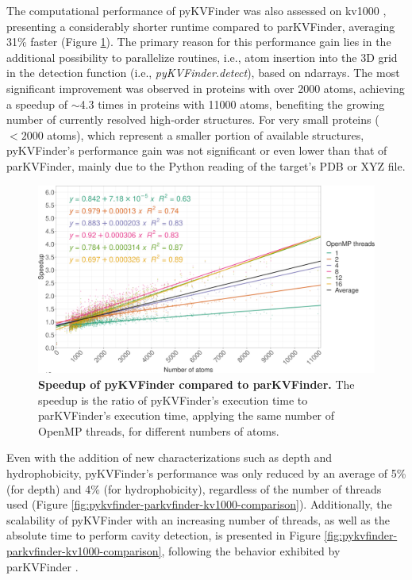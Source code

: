 \documentclass[Ingles]{phdthesis}
\def\ie{i.e.\onedot}
\begin{document}
The computational performance of pyKVFinder was also assessed on kv1000 \cite{guerra2020}, presenting a considerably shorter runtime compared to parKVFinder, averaging 31\% faster (Figure \ref{fig:pykvfinder-speedup}). The primary reason for this performance gain lies in the additional possibility to parallelize routines, \ie, atom insertion into the 3D grid in the detection function (\ie, \textit{pyKVFinder.detect}), based on \acsp{ndarray}. The most significant improvement was observed in proteins with over 2000 atoms, achieving a speedup of $\sim$4.3 times in proteins with 11000 atoms, benefiting the growing number of currently resolved high-order structures. For very small proteins ($\less 2000$ atoms), which represent a smaller portion of available structures, pyKVFinder's performance gain was not significant or even lower than that of parKVFinder, mainly due to the Python reading of the target's PDB or XYZ file. 

\begin{figure}[h]
  \centering
  \includegraphics[scale=1]{images/pykvfinder-speedup.png}
  \caption[Speedup of pyKVFinder compared to parKVFinder]{\textbf{Speedup of pyKVFinder compared to parKVFinder.} The speedup is the ratio of pyKVFinder's execution time to parKVFinder's execution time, applying the same number of OpenMP threads, for different numbers of atoms.}
  \label{fig:pykvfinder-speedup}
\end{figure}

Even with the addition of new characterizations such as depth and hydrophobicity, pyKVFinder's performance was only reduced by an average of 5\% (for depth) and 4\% (for hydrophobicity), regardless of the number of threads used (Figure \ref{fig:pykvfinder-parkvfinder-kv1000-comparison}). Additionally, the scalability of pyKVFinder with an increasing number of threads, as well as the absolute time to perform cavity detection, is presented in Figure \ref{fig:pykvfinder-parkvfinder-kv1000-comparison}, following the behavior exhibited by parKVFinder \cite{guerra2020}.
\end{document}
